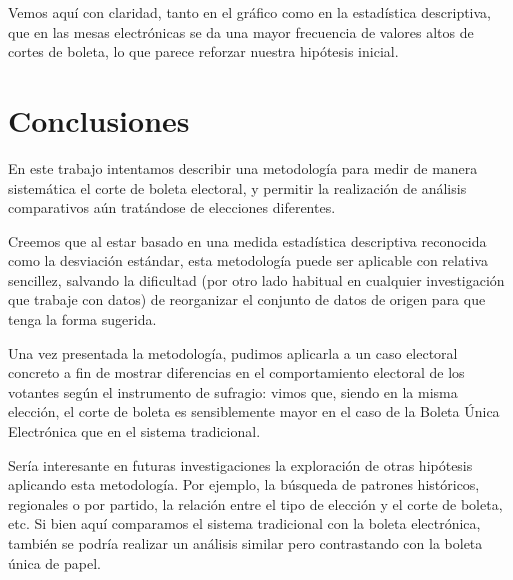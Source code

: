 \documentclass[12pt,a4paper]{article}
\begin{document}
Vemos aquí con claridad, tanto en el gráfico como en la estadística descriptiva,
que en las mesas electrónicas se da una mayor frecuencia de valores altos de
cortes de boleta, lo que parece reforzar nuestra hipótesis inicial.

\pagebreak

\section{Conclusiones}
En este trabajo intentamos describir una metodología para medir de manera
sistemática el corte de boleta electoral, y permitir la realización de análisis
comparativos aún tratándose de elecciones diferentes.

Creemos que al estar basado en una medida estadística descriptiva reconocida
como la desviación estándar, esta metodología puede ser aplicable con relativa
sencillez, salvando la dificultad (por otro lado habitual en cualquier
investigación que trabaje con datos) de reorganizar el conjunto de datos de
origen para que tenga la forma sugerida.

Una vez presentada la metodología, pudimos aplicarla a un caso electoral
concreto a fin de mostrar diferencias en el comportamiento electoral de los
votantes según el instrumento de sufragio: vimos que, siendo en la misma
elección, el corte de boleta es sensiblemente mayor en el caso de la Boleta
Única Electrónica que en el sistema tradicional.

Sería interesante en futuras investigaciones la exploración de otras hipótesis
aplicando esta metodología. Por ejemplo, la búsqueda de patrones históricos,
regionales o por partido, la relación entre el tipo de elección y el corte de
boleta, etc. Si bien aquí comparamos el sistema tradicional con la boleta
electrónica, también se podría realizar un análisis similar pero contrastando con la
boleta única de papel.

\pagebreak
\end{document}
